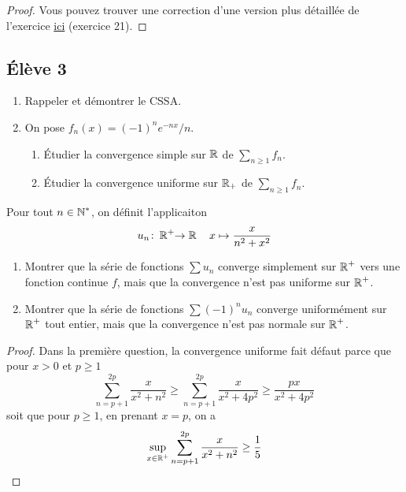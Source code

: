 \documentclass[10pt]{scrartcl}
\begin{document}
    \begin{proof}
        Vous pouvez trouver une correction d'une version plus détaillée de l'exercice \href{https://www.bibmath.net/ressources/index.php?action=affiche&quoi=mathspe/feuillesexo/suiserfonc&type=fexo}{ici} (exercice 21).
    \end{proof}

    \subsection*{Élève 3}
    \begin{ccp}\hfill
        \begin{enumerate}
            \item Rappeler et démontrer le CSSA.
            \item On pose $f_n(x)=(-1)^ne^{-nx}/n$. 
            \begin{enumerate}
                \item Étudier la convergence simple sur $\operatorname{\mathbb R}$ de $\sum_{n\geq 1} f_n$. 
                \item Étudier la convergence uniforme sur $\operatorname{\mathbb R}_+$ de $\sum_{n\geq 1} f_n$.
            \end{enumerate}
        \end{enumerate}
    \end{ccp}

    \begin{exo}
        Pour tout $n\in\operatorname{\mathbb N}^*$, on définit l'applicaiton
        \[
            u_n\colon\operatorname{\mathbb R}^+\hskip-.3em\to\operatorname{\mathbb R}\quad x\mapsto\frac x{n^2+x^2}
        \]
        \begin{enumerate}
            \item Montrer que la série de fonctions $\sum u_n$ converge simplement sur $\operatorname{\mathbb R}^+$ vers une fonction continue $f$, mais que la convergence n'est pas uniforme sur $\operatorname{\mathbb R}^+$.
            \item Montrer que la série de fonctions $\sum (-1)^nu_n$ converge uniformément sur $\operatorname{\mathbb R}^+$ tout entier, mais que la convergence n'est pas normale sur $\operatorname{\mathbb R}^+$.
        \end{enumerate}
    \end{exo}

    \begin{proof}
        Dans la première question, la convergence uniforme fait défaut parce que pour $x>0$ et $p\geq 1$
        \[
            \sum_{n=p+1}^{2p}\frac{x}{x^2+n^2}\geq\sum_{n=p+1}^{2p}\frac{x}{x^2+4p^2}\geq\frac{px}{x^2+4p^2}
        \]
        soit que pour $p\geq 1$, en prenant $x=p$, on a 
        \[
            \sup_{x\in\operatorname{\mathbb R}^+}\sum_{n=p+1}^{2p}\frac{x}{x^2+n^2}\geq \frac15
        \]
    \end{proof}
\end{document}
